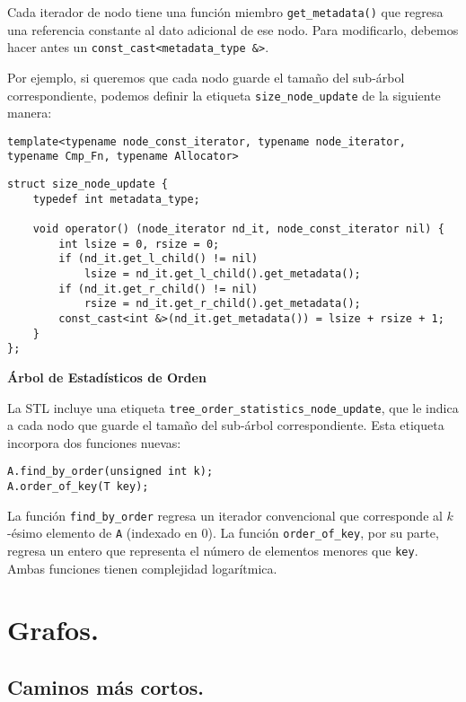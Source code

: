 \documentclass[10pt, letterpaper, twoside]{article}
\begin{document}
Cada iterador de nodo tiene una función miembro \texttt{get\_metadata()} que regresa una referencia constante al dato adicional de ese nodo. Para modificarlo, debemos hacer antes un \texttt{const\_cast<metadata\_type \&>}.

Por ejemplo, si queremos que cada nodo guarde el tamaño del sub-árbol correspondiente, podemos definir la etiqueta \texttt{size\_node\_update} de la siguiente manera:

\begin{lstlisting}
template<typename node_const_iterator, typename node_iterator, typename Cmp_Fn, typename Allocator>
\end{lstlisting}
\begin{lstlisting}[firstnumber = 2]
struct size_node_update {
    typedef int metadata_type;

    void operator() (node_iterator nd_it, node_const_iterator nil) {
        int lsize = 0, rsize = 0;
        if (nd_it.get_l_child() != nil)
            lsize = nd_it.get_l_child().get_metadata();
        if (nd_it.get_r_child() != nil)
            rsize = nd_it.get_r_child().get_metadata();
        const_cast<int &>(nd_it.get_metadata()) = lsize + rsize + 1;
    }
};
\end{lstlisting}

\textbf{Árbol de Estadísticos de Orden}

La STL incluye una etiqueta \texttt{tree\_order\_statistics\_node\_update}, que le indica a cada nodo que guarde el tamaño del sub-árbol correspondiente. Esta etiqueta incorpora dos funciones nuevas:
\begin{lstlisting}
A.find_by_order(unsigned int k);
A.order_of_key(T key);
\end{lstlisting}
La función \texttt{find\_by\_order} regresa un iterador convencional que corresponde al $k$-ésimo elemento de \texttt{A} (indexado en 0). La función \texttt{order\_of\_key}, por su parte, regresa un entero que representa el número de elementos menores que \texttt{key}. Ambas funciones tienen complejidad logarítmica.

 \medskip


\section{Grafos.}

\subsection{Caminos más cortos.}
\end{document}
